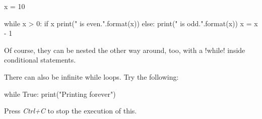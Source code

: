 \documentclass[11pt]{cselabheader}
\begin{document}
\begin{python3code}
x = 10

while x > 0:
    if x %
        print("{} is even.".format(x))
    else:
        print("{} is odd.".format(x))
    x = x - 1
\end{python3code}

Of course, they can be nested the other way around, too, with a
\pythoninline!while! inside conditional statements.

There can also be infinite while loops. Try the following:
\begin{python3code}
while True:
    print("Printing forever")
\end{python3code}

Press \emph{Ctrl+C} to stop the execution of this.

%
%
%
%
%
%
%
%
%
%
%
%
%
%
%
\end{document}
